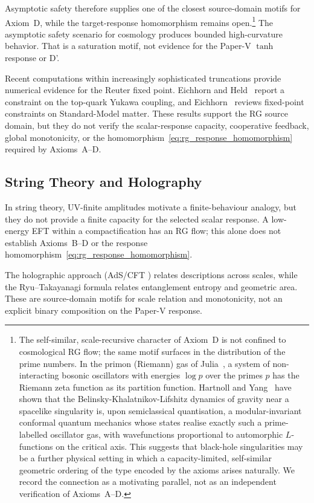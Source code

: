 \documentclass[aps,prd,twocolumn,superscriptaddress,nofootinbib]{revtex4-2}
\begin{document}
Asymptotic safety therefore supplies one of the closest source-domain motifs for Axiom~D, while the target-response homomorphism remains open.\footnote{The self-similar, scale-recursive character of Axiom~D is not
confined to cosmological RG flow; the same motif surfaces in the distribution
of the prime numbers. In the primon (Riemann) gas of Julia~\cite{Julia1990}, a
system of non-interacting bosonic oscillators with energies $\log p$ over the
primes $p$ has the Riemann zeta function as its partition function.
Hartnoll and Yang~\cite{HartnollYang2025} have shown that the
Belinsky-Khalatnikov-Lifshitz dynamics of gravity near a spacelike singularity
is, upon semiclassical quantisation, a modular-invariant conformal quantum
mechanics whose states realise exactly such a prime-labelled oscillator gas,
with wavefunctions proportional to automorphic $L$-functions on the critical
axis. This suggests that black-hole singularities may be a further physical
setting in which a capacity-limited, self-similar geometric ordering of the
type encoded by the axioms arises naturally. We record the connection as a
motivating parallel, not as an independent verification of Axioms~A--D.} The asymptotic safety scenario for cosmology \cite{Bonanno2002} produces bounded high-curvature behavior. That is a saturation motif, not evidence for the Paper-V $\tanh$ response or D'.

Recent computations within increasingly sophisticated truncations provide numerical evidence for the Reuter fixed point. Eichhorn and Held~\cite{EichhornHeld2018} report a constraint on the top-quark Yukawa coupling, and Eichhorn~\cite{Eichhorn2020} reviews fixed-point constraints on Standard-Model matter. These results support the RG source domain, but they do not verify the scalar-response capacity, cooperative feedback, global monotonicity, or the homomorphism~\eqref{eq:rg_response_homomorphism} required by Axioms~A--D.

\subsection{String Theory and Holography}

In string theory, UV-finite amplitudes motivate a finite-behaviour analogy, but they do not provide a finite capacity for the selected scalar response. A low-energy EFT within a compactification has an RG flow; this alone does not establish Axioms~B--D or the response homomorphism~\eqref{eq:rg_response_homomorphism}.

The holographic approach (AdS/CFT \cite{Maldacena1999}) relates descriptions across scales, while the Ryu--Takayanagi formula \cite{Ryu2006} relates entanglement entropy and geometric area. These are source-domain motifs for scale relation and monotonicity, not an explicit binary composition on the Paper-V response.
\end{document}
